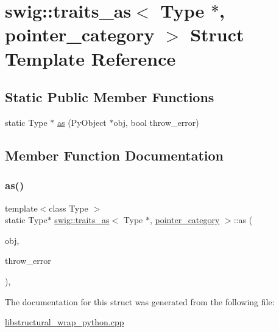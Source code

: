 \hypertarget{structswig_1_1traits__as_3_01_type_01_5_00_01pointer__category_01_4}{}\section{swig\+:\+:traits\+\_\+as$<$ Type $\ast$, pointer\+\_\+category $>$ Struct Template Reference}
\label{structswig_1_1traits__as_3_01_type_01_5_00_01pointer__category_01_4}
\subsection*{Static Public Member Functions}
\begin{DoxyCompactItemize}
\item 
static Type $\ast$ \hyperlink{structswig_1_1traits__as_3_01_type_01_5_00_01pointer__category_01_4_a7312181fed828608a6a29b4ff622a85f}{as} (Py\+Object $\ast$obj, bool throw\+\_\+error)
\end{DoxyCompactItemize}


\subsection{Member Function Documentation}
\mbox{\label{structswig_1_1traits__as_3_01_type_01_5_00_01pointer__category_01_4_a7312181fed828608a6a29b4ff622a85f}} 
\subsubsection{\texorpdfstring{as()}{as()}}
{\footnotesize\ttfamily template$<$class Type $>$ \\
static Type$\ast$ \hyperlink{structswig_1_1traits__as}{swig\+::traits\+\_\+as}$<$ Type $\ast$, \hyperlink{structswig_1_1pointer__category}{pointer\+\_\+category} $>$\+::as (\begin{DoxyParamCaption}\item[{Py\+Object $\ast$}]{obj,  }\item[{bool}]{throw\+\_\+error }\end{DoxyParamCaption})\hspace{0.3cm}{\ttfamily [inline]}, {\ttfamily [static]}}



The documentation for this struct was generated from the following file\+:\begin{DoxyCompactItemize}
\item 
\hyperlink{libstructural__wrap__python_8cpp}{libstructural\+\_\+wrap\+\_\+python.\+cpp}\end{DoxyCompactItemize}
